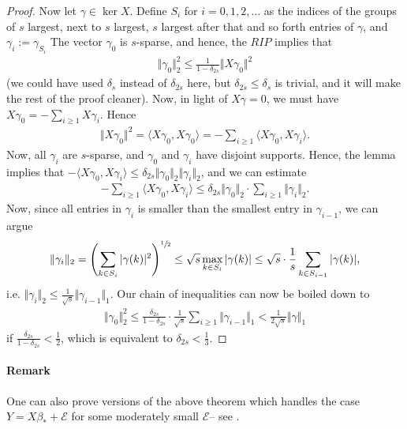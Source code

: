 \documentclass{article}
\newcommand{\calE}{\mathcal{E}}
\newcommand{\sprod}[1]{\langle #1 \rangle}
\newcommand{\abs}[1]{\vert #1 \vert}
\newcommand{\norm}[1]{\Vert #1 \Vert}
\begin{document}
\begin{proof}
   Now let $\gamma \in \ker X$. Define $S_i$ for $i=0,1,2,\dots$ as the indices of the groups of $s$ largest, next to $s$ largest, $s$ largest after that and so forth entries of $\gamma$, and $\gamma_i := \gamma_{S_i}$ The vector $\gamma_{0}$ is $s$-sparse, and hence, the $RIP$ implies that
   \begin{align*}
       \norm{\gamma_{0}}_2^2 \leq \frac{1}{1-\delta_{2s}} \norm{X\gamma_0}^2
   \end{align*}
   (we could have used $\delta_s$ instead of $\delta_{2s}$ here, but $\delta_{2s}\leq \delta_s$ is trivial, and it will make the rest of the proof cleaner). Now, in light of $X\gamma=0$, we must have $X\gamma_0 = - \sum_{i\geq 1} X\gamma_i$. Hence
   \begin{align*}
       \norm{X\gamma_0}^2 = \sprod{X \gamma_0,X\gamma_0} = - \sum_{i \geq 1} \sprod{X\gamma_0, X \gamma_{i}}.
   \end{align*}
   Now, all $\gamma_i$ are $s$-sparse, and $\gamma_0$ and $\gamma_i$ have disjoint supports. Hence, the lemma implies that $-\sprod{X\gamma_0, X \gamma_{i}} \leq \delta_{2s} \norm{\gamma_0}_2\norm{\gamma_i}_2$, and we can estimate
   \begin{align*}
        - \sum_{i \geq 1} \sprod{X\gamma_0, X \gamma_{i}} \leq \delta_{2s} \norm{\gamma_0}_2 \cdot \sum_{i \geq 1} \norm{\gamma_i}_2.
   \end{align*}
   Now, since all entries in $\gamma_i$ is smaller than the smallest entry in $\gamma_{i-1}$, we can argue
   \begin{align*}
       \norm{\gamma_i}_2 = \left(\sum_{k \in S_i} \abs{\gamma(k)}^2\right)^{\sfrac{1}{2}} \leq\sqrt{s} \max_{k \in S_i} \abs{\gamma(k)} \leq \sqrt{s} \cdot \frac{1}{s}\sum_{k \in S_{i-1}} \abs{\gamma(k)},
   \end{align*}
   i.e. $\norm{\gamma_i}_2 \leq \frac{1}{\sqrt{s}}\norm{\gamma_{i-1}}_1$. Our chain of inequalities can now be boiled down to
   \begin{align*}
         \norm{\gamma_{0}}_2^2 \leq \frac{\delta_{2s}}{1-\delta_{2s}} \cdot \frac{1}{\sqrt{s}} \sum_{i \geq 1} \norm{\gamma_{i-1}}_1 < \frac{1}{2\sqrt{s}} \norm{\gamma}_1
   \end{align*}
   if $\frac{\delta_{2s}}{1-\delta_{2s}}< \tfrac{1}{2}$, which is equivalent to $\delta_{2s}<\tfrac{1}{3}$.
\end{proof}

\paragraph{Remark} One can also prove versions of the above theorem which handles the case $Y=X\beta_*+\calE$ for some moderately small $\calE$-- see \cite[Sec. 5.3]{FouRau2013}.
\end{document}
